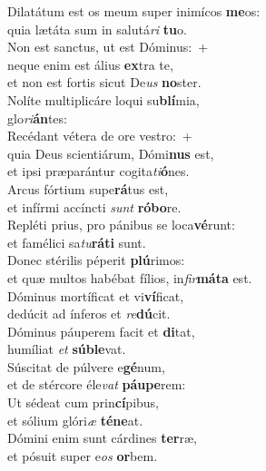 \evenverse Dilatátum est os meum super inimícos \textbf{me}os:~\*\\
\evenverse quia lætáta sum in salutá\textit{ri} \textbf{tu}o.\\
\oddverse Non est sanctus, ut est Dóminus:~+\\
\oddverse  neque enim est álius \textbf{ex}tra te,~\*\\
\oddverse et non est fortis sicut De\textit{us} \textbf{no}ster.\\
\evenverse Nolíte multiplicáre loqui su\textbf{blí}mia,~\*\\
\evenverse glo\textit{ri}\textbf{án}tes:\\
\oddverse Recédant vétera de ore vestro:~+\\
\oddverse  quia Deus scientiárum, Dómi\textbf{nus} est,~\*\\
\oddverse et ipsi præparántur cogita\textit{ti}\textbf{ó}nes.\\
\evenverse Arcus fórtium supe\textbf{rá}tus est,~\*\\
\evenverse et infírmi accíncti \textit{sunt} \textbf{ró}\textbf{bo}re.\\
\oddverse Repléti prius, pro pánibus se loca\textbf{vé}runt:~\*\\
\oddverse et famélici sa\textit{tu}\textbf{rá}\textbf{ti} sunt.\\
\evenverse Donec stérilis péperit \textbf{plú}rimos:~\*\\
\evenverse et quæ multos habébat fílios, in\textit{fir}\textbf{má}\textbf{ta} est.\\
\oddverse Dóminus mortíficat et vi\textbf{ví}ficat,~\*\\
\oddverse dedúcit ad ínferos et \textit{re}\textbf{dú}cit.\\
\evenverse Dóminus páuperem facit et \textbf{di}tat,~\*\\
\evenverse humíliat \textit{et} \textbf{sú}\textbf{ble}vat.\\
\oddverse Súscitat de púlvere e\textbf{gé}num,~\*\\
\oddverse et de stércore éle\textit{vat} \textbf{páu}\textbf{pe}rem:\\
\evenverse Ut sédeat cum prin\textbf{cí}pibus,~\*\\
\evenverse et sólium glóri\textit{æ} \textbf{té}\textbf{ne}at.\\
\oddverse Dómini enim sunt cárdines \textbf{ter}ræ,~\*\\
\oddverse et pósuit super e\textit{os} \textbf{or}bem.\\
